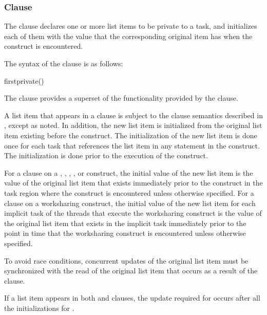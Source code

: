 \subsubsection{ Clause}
\label{subsubsec:firstprivate clause}
\summary
The  clause declares one or more list items to be private to a task, and
initializes each of them with the value that the corresponding original item has when the
construct is encountered.

\syntax
The syntax of the  clause is as follows:

\begin{ompSyntax}
firstprivate()
\end{ompSyntax}

\descr
The  clause provides a superset of the functionality provided by the
 clause.

A list item that appears in a  clause is subject to the  clause
semantics described in
,
except as noted. In addition, the
new list item is initialized from the original list item existing before the construct. The
initialization of the new list item is done once for each task that references the list item
in any statement in the construct. The initialization is done prior to the execution of the
construct.

For a  clause on a , ,
, , or  construct, the initial
value of the new list item is the value of the original list item that
exists immediately prior to the construct in the task region where the
construct is encountered unless otherwise specified. For a
 clause on a worksharing construct, the initial
value of the new list item for each implicit task of the threads that
execute the worksharing construct is the value of the original list
item that exists in the implicit task immediately prior to the point
in time that the worksharing construct is encountered unless otherwise
specified.

To avoid race conditions, concurrent updates of the original list item must be
synchronized with the read of the original list item that occurs as a result of the
 clause.

If a list item appears in both  and  clauses, the update
required for  occurs after all the initializations for .

